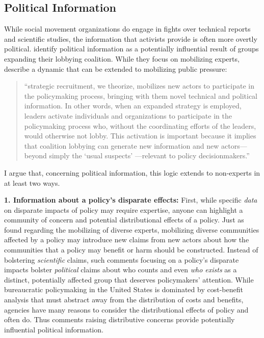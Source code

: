\documentclass[
      12pt,
        ]{article}
\begin{document}
\hypertarget{political-information}{%
\subsection{Political Information}\label{political-information}}

While social movement organizations do engage in fights over technical reports and scientific studies, the information that activists provide is often more overtly political.
\citet{Nelson2012}
identify political information as a potentially influential result of
groups expanding their lobbying coalition. While they focus on
mobilizing experts, \citet{Nelson2012} describe a dynamic that can be extended
to mobilizing public pressure:

\begin{quote}
``strategic recruitment, we theorize, mobilizes new actors to
participate in the policymaking process, bringing with them novel
technical and political information. In other words, when an expanded
strategy is employed, leaders activate individuals and organizations
to participate in the policymaking process who, without the
coordinating efforts of the leaders, would otherwise not lobby. This
activation is important because it implies that coalition lobbying can
generate new information and new actors---beyond simply the `usual
suspects' ---relevant to policy decisionmakers.''
\end{quote}

I argue that, concerning political information, this logic extends to
non-experts in at least two ways.

\textbf{1. Information about a policy's disparate effects:}
First, while specific \emph{data} on disparate impacts of policy may require expertise, anyone can highlight a community of concern and potential distributional effects of a policy. Just as \citet{Nelson2012} found regarding the mobilizing of diverse experts, mobilizing diverse communities affected by a policy may introduce new claims from new actors about how the communities that a policy may benefit or harm should be constructed. Instead of bolstering \emph{scientific} claims, such comments focusing on a policy's disparate impacts bolster \emph{political} claims about who counts and even \emph{who exists} as a distinct, potentially affected group that deserves policymakers' attention. While bureaucratic policymaking in the United States is dominated by cost-benefit analysis that must abstract away from the distribution of costs and benefits, agencies have many reasons to consider the distributional effects of policy and often do.
Thus comments raising distributive concerns provide potentially influential political information.
\end{document}
